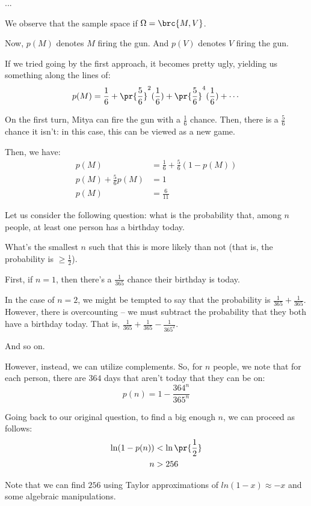 \documentclass[openany]{book}
\begin{document}
\begin{defn}
	...
\end{defn}

\begin{example}[Recursion]
	We observe that the sample space if $\Omega = \brc{M, V}$.
	
	Now, $p(M)$ denotes $M$ firing the gun. And $p(V)$ denotes $V$ firing the gun.
	
	If we tried going by the first approach, it becomes pretty ugly, yielding us something along the lines of:
	\begin{equation*}
		p(M) = \frac{1}{6} + \pr{\frac{5}{6}}^{2}(\frac{1}{6}) + \pr{\frac{5}{6}}^{4}(\frac 1 6) + \cdots
	\end{equation*}
	
	On the first turn, Mitya can fire the gun with a $\frac{1}{6}$ chance. Then, there is a $\frac{5}{6}$ chance it isn't: in this case, this can be viewed as a new game.
	
	Then, we have:
	\begin{align*}
		p(M) &= \frac{1}{6} + \frac{5}{6}(1 - p(M)) \\
		p(M) + \frac{5}{6}p(M) &= 1 \\
		p(M) &= \frac{6}{11}
	\end{align*}
\end{example}

\begin{example}
	Let us consider the following question: what is the probability that, among $n$ people, at least one person has a birthday today.
	
	What's the smallest $n$ such that this is more likely than not (that is, the probability is $\geq \frac{1}{2}$).
	
	First, if $n = 1$, then there's a $\frac{1}{365}$ chance their birthday is today.
	
	In the case of $n = 2$, we might be tempted to say that the probability is $\frac{1}{365} + \frac{1}{365}$. However, there is overcounting -- we must subtract the probability that they both have a birthday today. That is, $\frac{1}{365} + \frac{1}{365} - \frac{1}{365^{2}}$.
	
	And so on.
	
	However, instead, we can utilize complements. So, for $n$ people, we note that for each person, there are $364$ days that aren't today that they can be on:
	\begin{equation*}
		p(n) = 1 - \frac{364^{n}}{365^{n}}
	\end{equation*}
	
	Going back to our original question, to find a big enough $n$, we can proceed as follows:
	\begin{align*}
		\ln(1 - p(n)) &< \ln \pr{\frac 1 2} \\
		n &> 256
	\end{align*}
	
	Note that we can find $256$ using Taylor approximations of $ln(1 - x) \approx - x$ and some algebraic manipulations.
\end{example}
\end{document}
